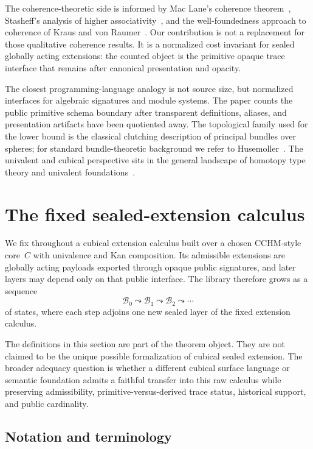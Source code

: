 \documentclass{lmcs}
\newcommand{\B}{\mathcal{B}}
\begin{document}
The coherence-theoretic side is informed by Mac Lane's coherence
theorem~\cite{maclane-coherence}, Stasheff's analysis of higher
associativity~\cite{stasheff}, and the well-foundedness approach to coherence of
Kraus and von Raumer~\cite{kraus-vonraumer}. Our contribution is not a replacement
for those qualitative coherence results. It is a normalized cost invariant for
sealed globally acting extensions: the counted object is the primitive opaque
trace interface that remains after canonical presentation and opacity.

The closest programming-language analogy is not source size, but normalized
interfaces for algebraic signatures and module systems. The paper counts the
public primitive schema boundary after transparent definitions, aliases, and
presentation artifacts have been quotiented away. The topological family used for
the lower bound is the classical clutching description of principal bundles over
spheres; for standard bundle-theoretic background we refer to
Husemoller~\cite{husemoller}. The univalent and cubical perspective sits in the
general landscape of homotopy type theory and univalent foundations~\cite{hott}.

\section{The fixed sealed-extension calculus}
\label{sec:framework}

We fix throughout a cubical extension calculus built over a chosen CCHM-style core~$C$ with univalence and Kan composition. Its admissible extensions are globally acting payloads exported through opaque public signatures, and later layers may depend only on that public interface. The library therefore grows as a sequence
\[
  \B_0 \leadsto \B_1 \leadsto \B_2 \leadsto \cdots
\]
of states, where each step adjoins one new sealed layer of the fixed extension calculus.

The definitions in this section are part of the theorem object. They are not claimed to be the unique possible formalization of cubical sealed extension. The broader adequacy question is whether a different cubical surface language or semantic foundation admits a faithful transfer into this raw calculus while preserving admissibility, primitive-versus-derived trace status, historical support, and public cardinality.

\subsection{Notation and terminology}
\label{subsec:notation-terminology}
\end{document}
